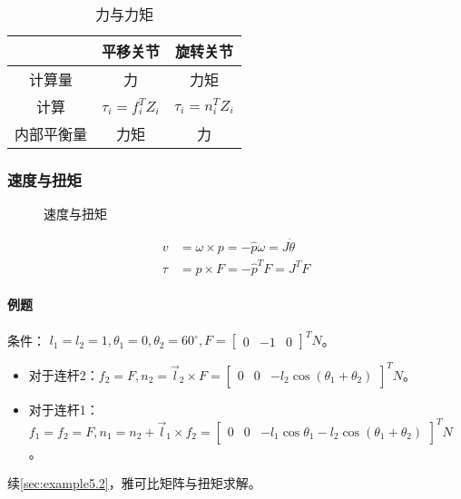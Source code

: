 \documentclass[
12pt, %
a4paper, 
oneside, %
headinclude,footinclude, %
]{scrartcl}
\begin{document}
\begin{table}[H]
\centering
\begin{tabular}{c|cc}
\hline
& 平移关节 & 旋转关节 \\
\hline
计算量 & 力 & 力矩 \\
计算 & $ \tau_i = f_i^T Z_i $ & $ \tau_i = n_i^T Z_i $ \\
内部平衡量 & 力矩 & 力 \\
\hline
\end{tabular}
\caption{力与力矩}
\end{table}
\subsubsection{速度与扭矩}
\begin{figure}[H]
\centering
\subfloat[角速度与线速度]{\texttt{[image: wv]}} \quad
\subfloat[力与扭矩]{\texttt{[image: ft]}} \quad
\subfloat[例题]{\texttt{[image: 5]}}
\caption[速度与扭矩]{速度与扭矩}
\end{figure}

\begin{align*}
v &= \omega \times p = -\hat{p} \omega = J \dot{\theta} \\
\tau &= p \times F = -\hat{p}^T F = J^T F
\end{align*}
\paragraph{例题}\label{sec:example5.1}
条件： $ l_1 = l_2 = 1, \theta_1 = 0, \theta_2 = 60^\circ, F = \begin{bmatrix} 0 & -1 & 0 \end{bmatrix}^T N $。
\begin{itemize}
\item 对于连杆2：$ f_2 = F, n_2 = \vec{l}_2 \times F = \begin{bmatrix} 0 & 0 & -l_2 \cos(\theta_1 + \theta_2) \end{bmatrix}^T N $。
\item 对于连杆1：$ f_1 = f_2 = F, n_1 = n_2 + \vec{l}_1 \times f_2 = \begin{bmatrix} 0 & 0 & -l_1 \cos\theta_1 - l_2 \cos(\theta_1 + \theta_2) \end{bmatrix}^T N $。
\end{itemize}

续\ref{sec:example5.2}，雅可比矩阵与扭矩求解。
\end{document}
